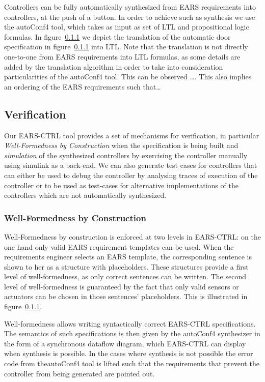 Controllers can be fully automatically synthesized from EARS requirements into
controllers, at the push of a button. In order to achieve such as synthesis we
use the \textsf{autoConf4} tool, which takes as input as set of LTL and
propositional logic formulas. In figure~\ref{} we depict the translation of the
automatic door specification in figure~\ref{} into LTL. Note that the
translation is not directly one-to-one from EARS requirements into LTL formulas,
as some details are added by the translation algorithm in order to take into
consideration particularities of the \textsf{autoConf4} tool. This can be
observed \ldots. This also implies an ordering of the EARS requirements such
that\ldots

\subsection{Verification}

Our \textsf{EARS-CTRL} tool provides a set of mechanisms for verification, in
particular \emph{Well-Formedness by Construction} when the specification is
being built and \emph{simulation} of the synthesized controllers by exercising the
controller manually using \textsf{simulink} as a back-end. We can also generate
test cases for controllers that can either be used to debug the controller by
analysing traces of execution of the controller or to be used as test-cases for
alternative implementations of the controllers which are not automatically
synthesized.

\subsubsection{Well-Formedness by Construction}

Well-Formedness by construction is enforced at two levels in \textsf{EARS-CTRL}:
on the one hand only valid EARS requirement templates can be used. When the
requirements engineer selects an EARS template, the corresponding sentence is
shown to her as a structure with placeholders. These structures provide a
first level of well-formedness, as only correct sentences can be written. The
second level of well-formedness is guaranteed by the fact that only valid
sensors or actuators can be chosen in those sentences' placeholders. This is
illustrated in figure~\ref{}.

Well-formedness allows writing syntactically correct \textsf{EARS-CTRL}
specifications. The semantics of such specifications is then given by the
\textsf{autoConf4} synthesizer in the form of a synchronous dataflow diagram,
which \textsf{EARS-CTRL} can display when synthesis is possible. In the cases
where synthesis is not possible the error code from the\textsf{autoConf4} tool
is lifted such that the requirements that prevent the controller from being
generated are pointed out. 


